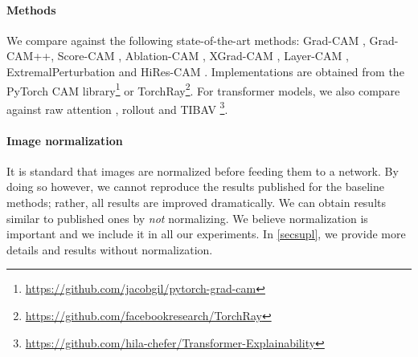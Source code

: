 \paragraph{Methods}

We compare against the following state-of-the-art methods: Grad-CAM \autocite{selvaraju2017grad}, 
Grad-CAM++\cite{chattopadhay2018grad}, Score-CAM \autocite{wang2020score}, Ablation-CAM 
\autocite{ramaswamy2020ablation}, XGrad-CAM \autocite{axiombased}, Layer-CAM 
\autocite{jiang2021layercam}, ExtremalPerturbation \autocite{fong2019understanding} 
and HiRes-CAM \autocite{draelos2020use}. Implementations are obtained from the PyTorch CAM 
library\footnote{\url{https://github.com/jacobgil/pytorch-grad-cam}} or 
TorchRay\footnote{\url{https://github.com/facebookresearch/TorchRay}}. For transformer models, 
we also compare against raw attention \autocite{dosovitskiy2020image}, 
rollout \autocite{abnar2020quantifying} and TIBAV \cite{chefer2021transformer}\footnote{\url{
https://github.com/hila-chefer/Transformer-Explainability}}.

\paragraph{Image normalization}

It is standard that images are normalized before feeding them to a network. By doing so however, 
we cannot reproduce the results published for the baseline methods; rather, all results are 
improved dramatically. We can obtain results similar to published ones by \emph{not} normalizing. 
We believe normalization is important and we include it in all our experiments. 
In \ref{secsupl}, we provide more details and results without normalization.
